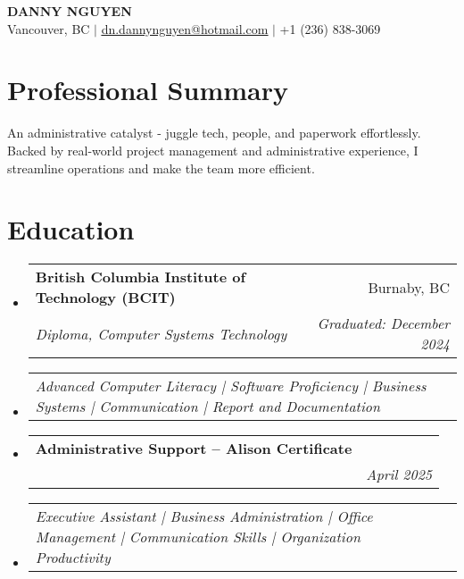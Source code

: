 \documentclass[letterpaper,11pt]{article}
\makeatletter
\newcommand{\resumeSubheading}[4]{
\vspace{-2pt}\item
\begin{tabular*}{0.97\textwidth}[t]{l@{\extracolsep{\fill}}r}
\textbf{#1} & #2 \\
\textit{\small#3} & \textit{\small #4} \\
\end{tabular*}\vspace{-7pt}
}
\newcommand{\resumeSubSubheading}[2]{
\item
\begin{tabular*}{0.97\textwidth}{l@{\extracolsep{\fill}}r}
\textit{\small#1} & \textit{\small #2} \\
\end{tabular*}\vspace{-7pt}
}
\newcommand{\resumeSubHeadingListStart}{\begin{itemize}[leftmargin=0.15in, label={}]}
\newcommand{\resumeSubHeadingListEnd}{\end{itemize}}
\makeatother
\begin{document}
\begin{center}
\textbf{\Huge \scshape DANNY NGUYEN} \\ \vspace{1pt}
\small Vancouver, BC $|$ \href{mailto:dn.dannynguyen@hotmail.com}{\underline{dn.dannynguyen@hotmail.com}} $|$
+1 (236) 838-3069
\end{center}


\section{Professional Summary} %
An administrative catalyst - juggle tech, people, and paperwork effortlessly. Backed by real-world project management and
administrative experience, I streamline operations and make the team more efficient.

\section{Education}
\resumeSubHeadingListStart
\resumeSubheading{British Columbia Institute of Technology (BCIT)}{Burnaby, BC}{Diploma, Computer Systems Technology}{Graduated: December 2024}
\resumeSubSubheading{Advanced Computer Literacy | Software Proficiency | Business Systems | Communication | Report and Documentation}{}
\resumeSubheading{Administrative Support – Alison Certificate}{}{}{April 2025}
\resumeSubSubheading{Executive Assistant | Business Administration | Office Management | Communication Skills | Organization Productivity}{}
\resumeSubHeadingListEnd
\end{document}
